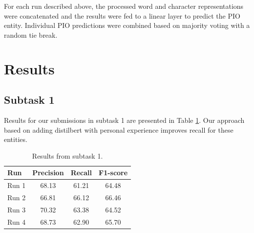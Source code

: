 \documentclass[11pt]{article}
\begin{document}
%
For each run described above, the processed word and character representations were concatenated and the results were fed to a linear layer to predict the PIO entity.
Individual PIO predictions were combined based on majority voting with a random tie break.
%
%
%
\section{Results}
\label{results}
%
%
%
\subsection{Subtask 1}
\label{res:task1}
%
Results for our submissions in subtask 1 are presented in Table \ref{tab:task_1}. Our approach based on adding distilbert with personal experience improves recall for these entities.

\begin{table}[ht]
    \centering
    \begin{tabular}{lccc}
        \toprule
        Run & Precision & Recall & F1-score \\
        \midrule
        Run 1 & 68.13 & 61.21 & 64.48 \\
        Run 2 & 66.81 & 66.12 & 66.46 \\
        Run 3 & 70.32 & 63.38 & 64.52 \\
        Run 4 & 68.73 & 62.90 & 65.70 \\
        \bottomrule
    \end{tabular}
    \caption{Results from subtask 1.}
    \label{tab:task_1}
\end{table}
%
%
%
\end{document}
